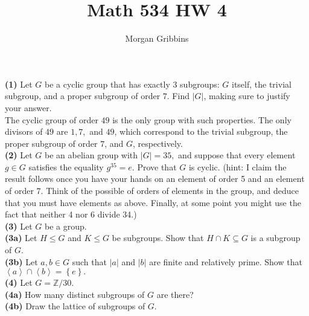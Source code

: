\documentclass[12pt,letterpaper]{article}
\title{Math 534 HW 4}
\author{Morgan Gribbins}
\date{}
\begin{document}
	
\maketitle

\textbf{(1)} Let \(G\) be a cyclic group that has exactly 3 subgroups: \(G\) itself, the trivial subgroup, and a proper subgroup of order \(7\). Find \(|G|\), making sure to justify your answer. \\

The cyclic group of order \(49\) is the only group with such properties. The only divisors of \(49\) are \(1,7,\) and \(49\), which correspond to the trivial subgroup, the proper subgroup of order \(7\), and \(G\), respectively. \\

\textbf{(2)} Let \(G\) be an abelian group with \(|G|= 35,\) and suppose that every element \(g \in G \) satisfies the equality \(g^{35}=e\).  Prove that \(G\) is cyclic.  (hint: I claim the result follows once you have your hands on an element of order 5 and an element of order 7.  Think of the possible of orders of elements in the group, and deduce that you must have elements as above.  Finally, at some point you might use the fact that neither 4 nor 6 divide 34.) \\



\textbf{(3)} Let \(G\) be a group.\\

\textbf{(3a)} Let \(H \leq G\) and \(K \leq G\) be subgroups. Show that \(H \cap K \subseteq G\) is a subgroup of \(G\). \\



\textbf{(3b)} Let \(a,b \in G\) such that \(|a|\) and \(|b|\) are finite and relatively prime. Show that \(\left<a\right> \cap \left<b\right> = \left\{e\right\}.\) \\



\textbf{(4)} Let \(G = \mathbb{Z}/30\). \\

\textbf{(4a)} How many distinct subgroups of \(G\) are there? \\



\textbf{(4b)} Draw the lattice of subgroups of \(G\). \\
\end{document}
